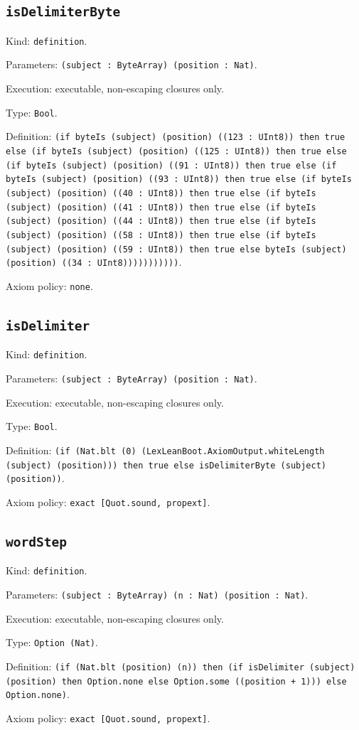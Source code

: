 \documentclass[11pt]{article}
\begin{document}
\subsection*{\texttt{isDelimiterByte}}
\noindent Kind: \texttt{definition}.\par
\noindent Parameters: \texttt{(subject : ByteArray) (position : Nat)}.\par
\noindent Execution: executable, non-escaping closures only.\par
\noindent Type: \texttt{Bool}.\par
\noindent Definition: \texttt{(if byteIs (subject) (position) ((123 : UInt8)) then true else (if byteIs (subject) (position) ((125 : UInt8)) then true else (if byteIs (subject) (position) ((91 : UInt8)) then true else (if byteIs (subject) (position) ((93 : UInt8)) then true else (if byteIs (subject) (position) ((40 : UInt8)) then true else (if byteIs (subject) (position) ((41 : UInt8)) then true else (if byteIs (subject) (position) ((44 : UInt8)) then true else (if byteIs (subject) (position) ((58 : UInt8)) then true else (if byteIs (subject) (position) ((59 : UInt8)) then true else byteIs (subject) (position) ((34 : UInt8)))))))))))}.\par
\noindent Axiom policy: \texttt{none}.\par
\subsection*{\texttt{isDelimiter}}
\noindent Kind: \texttt{definition}.\par
\noindent Parameters: \texttt{(subject : ByteArray) (position : Nat)}.\par
\noindent Execution: executable, non-escaping closures only.\par
\noindent Type: \texttt{Bool}.\par
\noindent Definition: \texttt{(if (Nat.blt (0) (LexLeanBoot.AxiomOutput.whiteLength (subject) (position))) then true else isDelimiterByte (subject) (position))}.\par
\noindent Axiom policy: \texttt{exact [Quot.sound, propext]}.\par
\subsection*{\texttt{wordStep}}
\noindent Kind: \texttt{definition}.\par
\noindent Parameters: \texttt{(subject : ByteArray) (n : Nat) (position : Nat)}.\par
\noindent Execution: executable, non-escaping closures only.\par
\noindent Type: \texttt{Option (Nat)}.\par
\noindent Definition: \texttt{(if (Nat.blt (position) (n)) then (if isDelimiter (subject) (position) then Option.none else Option.some ((position + 1))) else Option.none)}.\par
\noindent Axiom policy: \texttt{exact [Quot.sound, propext]}.\par
\end{document}
